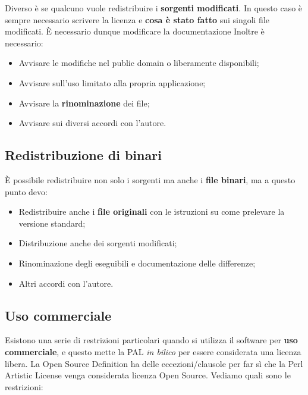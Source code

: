 Diverso è se qualcuno vuole redistribuire i \textbf{sorgenti modificati}. In questo caso è sempre necessario scrivere la licenza e \textbf{cosa è stato fatto} sui singoli file modificati. È necessario dunque modificare la documentazione Inoltre è necessario:

\begin{itemize}

\item Avvisare le modifiche nel public domain o liberamente disponibili;
\item Avvisare sull'uso limitato alla propria applicazione;
\item Avvisare la \textbf{rinominazione} dei file;
\item Avvisare sui diversi accordi con l'autore.

\end{itemize}

\subsection{Redistribuzione di binari}

È possibile redistribuire non solo i sorgenti ma anche i \textbf{file binari}, ma a questo punto devo:

\begin{itemize}

\item Redistribuire anche i \textbf{file originali} con le istruzioni su come prelevare la versione standard;
\item Distribuzione anche dei sorgenti modificati;
\item Rinominazione degli eseguibili e documentazione delle differenze;
\item Altri accordi con l'autore.

\end{itemize}

\subsection{Uso commerciale}

Esistono una serie di restrizioni particolari quando si utilizza il software per \textbf{uso commerciale}, e questo mette la PAL \textit{in bilico} per essere considerata una licenza libera. La Open Source Definition ha delle eccezioni/clausole per far sì che la Perl Artistic License venga considerata licenza Open Source. Vediamo quali sono le restrizioni:

